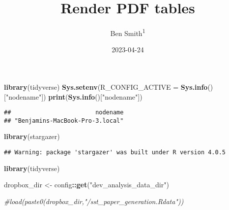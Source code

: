 \documentclass[
  english,
  ,man]{apa6}
\title{Render PDF tables}
\author{Ben Smith\textsuperscript{1}}
\date{2023-04-24}
\affiliation{\vspace{0.5cm}\textsuperscript{1} University of Oregon}
\newenvironment{Shaded}{\begin{snugshade}}{\end{snugshade}}
\newcommand{\CommentTok}[1]{\textcolor[rgb]{0.56,0.35,0.01}{\textit{#1}}}
\newcommand{\DataTypeTok}[1]{\textcolor[rgb]{0.13,0.29,0.53}{#1}}
\newcommand{\KeywordTok}[1]{\textcolor[rgb]{0.13,0.29,0.53}{\textbf{#1}}}
\newcommand{\NormalTok}[1]{#1}
\newcommand{\OperatorTok}[1]{\textcolor[rgb]{0.81,0.36,0.00}{\textbf{#1}}}
\newcommand{\StringTok}[1]{\textcolor[rgb]{0.31,0.60,0.02}{#1}}
\begin{document}
\maketitle

\begin{Shaded}
\begin{Highlighting}[]
\KeywordTok{library}\NormalTok{(tidyverse)}
\KeywordTok{Sys.setenv}\NormalTok{(}\DataTypeTok{R_CONFIG_ACTIVE =} \KeywordTok{Sys.info}\NormalTok{()[}\StringTok{"nodename"}\NormalTok{])}
\KeywordTok{print}\NormalTok{(}\KeywordTok{Sys.info}\NormalTok{()[}\StringTok{"nodename"}\NormalTok{])}
\end{Highlighting}
\end{Shaded}

\begin{verbatim}
##                        nodename 
## "Benjamins-MacBook-Pro-3.local"
\end{verbatim}

\begin{Shaded}
\begin{Highlighting}[]
\KeywordTok{library}\NormalTok{(stargazer)}
\end{Highlighting}
\end{Shaded}

\begin{verbatim}
## Warning: package 'stargazer' was built under R version 4.0.5
\end{verbatim}

\begin{Shaded}
\begin{Highlighting}[]
\KeywordTok{library}\NormalTok{(tidyverse)}

\NormalTok{dropbox_dir <-}\StringTok{ }\NormalTok{config}\OperatorTok{::}\KeywordTok{get}\NormalTok{(}\StringTok{"dev_analysis_data_dir"}\NormalTok{)}

\CommentTok{#load(paste0(dropbox_dir,"/sst_paper_generation.Rdata"))}
\end{Highlighting}
\end{Shaded}
\end{document}
